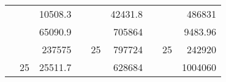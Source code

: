 \begin{table}[H]
\begin{tabular}{|ccrccrccc}
\rowcolor[HTML]{DAE8FC} 
\multicolumn{1}{|c|}{\cellcolor[HTML]{FFFFC7}}                                & \multicolumn{1}{c|}{\cellcolor[HTML]{DAE8FC}}                      & \multicolumn{1}{r|}{\cellcolor[HTML]{DAE8FC}10508.3}   & \multicolumn{1}{c|}{\cellcolor[HTML]{FFFFC7}}                                & \multicolumn{1}{c|}{\cellcolor[HTML]{DAE8FC}}                       & \multicolumn{1}{r|}{\cellcolor[HTML]{DAE8FC}42431.8}   & \multicolumn{1}{c|}{\cellcolor[HTML]{FFFFC7}}                                & \multicolumn{1}{c|}{\cellcolor[HTML]{DAE8FC}}                      & \multicolumn{1}{r|}{\cellcolor[HTML]{DAE8FC}486831}    \\ \cline{3-3} \cline{6-6} \cline{9-9} 
\multicolumn{1}{|c|}{\cellcolor[HTML]{FFFFC7}}                                & \multicolumn{1}{c|}{\cellcolor[HTML]{DAE8FC}}                      & \multicolumn{1}{r|}{\cellcolor[HTML]{DDFDFF}65090.9}   & \multicolumn{1}{c|}{\cellcolor[HTML]{FFFFC7}}                                & \multicolumn{1}{c|}{\cellcolor[HTML]{DAE8FC}}                       & \multicolumn{1}{r|}{\cellcolor[HTML]{DDFDFF}705864}    & \multicolumn{1}{c|}{\cellcolor[HTML]{FFFFC7}}                                & \multicolumn{1}{c|}{\cellcolor[HTML]{DAE8FC}}                      & \multicolumn{1}{r|}{\cellcolor[HTML]{DDFDFF}9483.96}   \\ \cline{3-3} \cline{6-6} \cline{9-9} 
\rowcolor[HTML]{DAE8FC} 
\multicolumn{1}{|c|}{\cellcolor[HTML]{FFFFC7}}                                & \multicolumn{1}{c|}{\cellcolor[HTML]{DAE8FC}}                      & \multicolumn{1}{r|}{\cellcolor[HTML]{DAE8FC}237575}    & \multicolumn{1}{c|}{\cellcolor[HTML]{FFFFC7}}                                & \multicolumn{1}{c|}{\multirow{-9}{*}{\cellcolor[HTML]{DAE8FC}25}}   & \multicolumn{1}{r|}{\cellcolor[HTML]{DAE8FC}797724}    & \multicolumn{1}{c|}{\cellcolor[HTML]{FFFFC7}}                                & \multicolumn{1}{c|}{\multirow{-9}{*}{\cellcolor[HTML]{DAE8FC}25}}  & \multicolumn{1}{r|}{\cellcolor[HTML]{DAE8FC}242920}    \\ \cline{3-3} \cline{5-6} \cline{8-9} 
\multicolumn{1}{|c|}{\cellcolor[HTML]{FFFFC7}}                                & \multicolumn{1}{c|}{\multirow{-10}{*}{\cellcolor[HTML]{DAE8FC}25}} & \multicolumn{1}{r|}{\cellcolor[HTML]{DDFDFF}25511.7}   & \multicolumn{1}{c|}{\cellcolor[HTML]{FFFFC7}}                                & \multicolumn{1}{c|}{\cellcolor[HTML]{DDFDFF}}                       & \multicolumn{1}{r|}{\cellcolor[HTML]{DAE8FC}628684}    & \multicolumn{1}{c|}{\cellcolor[HTML]{FFFFC7}}                                & \multicolumn{1}{c|}{\cellcolor[HTML]{DDFDFF}}                      & \multicolumn{1}{r|}{\cellcolor[HTML]{DAE8FC}1004060}   \\ \cline{2-3} \cline{6-6} \cline{9-9} 

\end{tabular}
\end{table}
